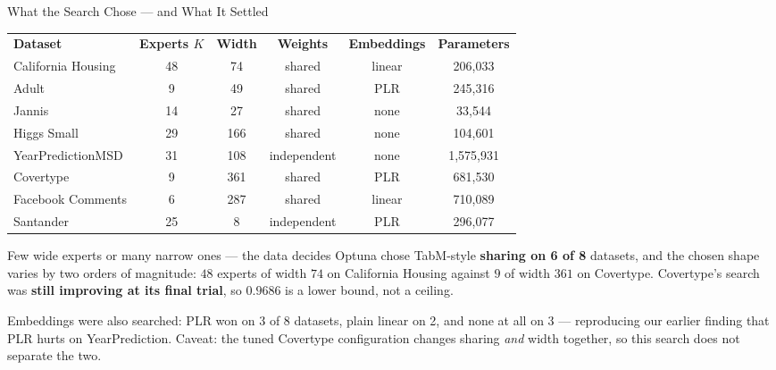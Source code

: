 \documentclass[aspectratio=169, xcolor=table]{beamer}
\begin{document}
\begin{frame}{What the Search Chose --- and What It Settled}
    \small
    \begin{table}
        \centering
        \renewcommand{\arraystretch}{1.08}
        \scriptsize
        \begin{tabular}{l | c | c | c | c | c}
            \rowcolor{PrimaryColor} \color{white}\textbf{Dataset} & \color{white}\textbf{Experts $K$} & \color{white}\textbf{Width} & \color{white}\textbf{Weights} & \color{white}\textbf{Embeddings} & \color{white}\textbf{Parameters} \\
            California Housing & 48 & 74 & shared & linear & 206{,}033 \\
            \rowcolor{LightGrey} Adult & 9 & 49 & shared & PLR & 245{,}316 \\
            Jannis & 14 & 27 & shared & none & 33{,}544 \\
            \rowcolor{LightGrey} Higgs Small & 29 & 166 & shared & none & 104{,}601 \\
            YearPredictionMSD & 31 & 108 & independent & none & 1{,}575{,}931 \\
            \rowcolor{LightGrey} Covertype & 9 & 361 & shared & PLR & 681{,}530 \\
            Facebook Comments & 6 & 287 & shared & linear & 710{,}089 \\
            \rowcolor{LightGrey} Santander & 25 & 8 & independent & PLR & 296{,}077 \\
        \end{tabular}
    \end{table}
    \vspace{-0.05cm}
    \begin{block}{Few wide experts or many narrow ones --- the data decides}
        Optuna chose TabM-style \textbf{sharing on 6 of 8} datasets, and the chosen shape varies by
        two orders of magnitude: $48$ experts of width $74$ on California Housing against
        $9$ of width $361$ on Covertype. Covertype's search was \textbf{still improving at its
        final trial}, so $0.9686$ is a lower bound, not a ceiling.
    \end{block}
    \vspace{-0.1cm}
    \tiny Embeddings were also searched: PLR won on 3 of 8 datasets, plain linear on 2, and none at all on 3 ---
    reproducing our earlier finding that PLR hurts on YearPrediction. Caveat: the tuned Covertype configuration
    changes sharing \emph{and} width together, so this search does not separate the two.
\end{frame}
\end{document}
